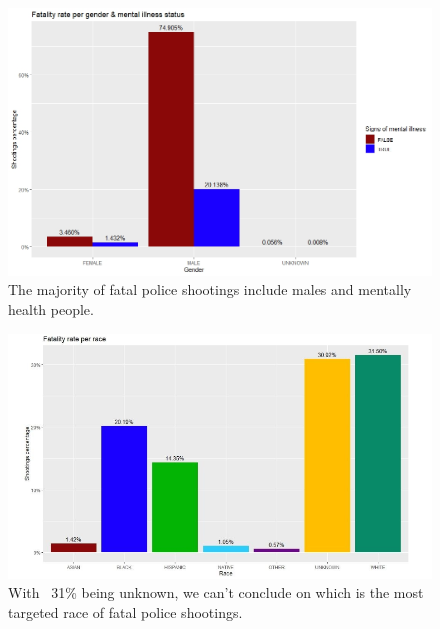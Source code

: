 \documentclass[11pt, journal]{IEEEtran}
\begin{document}
\newpage


\begin{figure}[htb]
	\centering
		\includegraphics[width=1.0\columnwidth]{images/snapshot12}
	\caption{The majority of fatal police shootings include males and mentally health people.}
	\label{fig:probov}
\end{figure}


\begin{figure}[htb]
	\centering
		\includegraphics[width=1.0\columnwidth]{images/snapshot8}
	\caption{With ~31\% being unknown, we can’t conclude on which is the most targeted race of fatal police shootings.}
	\label{fig:probov}
\end{figure}
\end{document}

